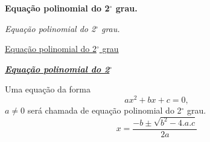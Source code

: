 \documentclass[a4paper, 12pt]{article}
\begin{document}
\begin{center}
\textbf{Equa\c c\~ao polinomial do 2$^\circ$ grau.}
\end{center}
\begin{flushright}
\textit{Equação polinomial do 2$^\circ$ grau.}
\end{flushright}

\begin{flushleft}
\underline{Equação polinomial do 2$^\circ$ grau}
\end{flushleft}

\begin{center}
\textit{\textbf{\underline{Equação polinomial do 2$^\circ$}}}
\end{center}

Uma equação da forma $$ax^2 + bx + c = 0,$$ $a \neq 0$ será chamada de equação polinomial do 2$^\circ$ grau.
$$x=\frac{ -b \pm \sqrt{b^2 - 4.a.c}}{2a} $$
\end{document}
